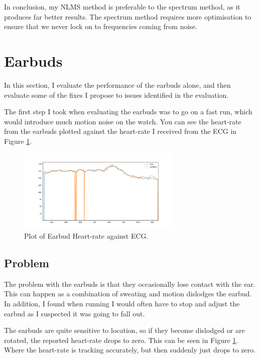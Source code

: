 \documentclass[12pt,a4paper,twoside,openright]{report}
\begin{document}
In conclusion, my NLMS method is preferable to the spectrum method, as it
produces far better results. The spectrum method requires more optimisation to
ensure that we never lock on to frequencies coming from noise.

\section{Earbuds}

In this section, I evaluate the performance of the earbuds alone, and then
evaluate some of the fixes I propose to issues identified in the evaluation.

The first step I took when evaluating the earbuds was to go on a fast run,
which would introduce much motion noise on the watch. You can see the
heart-rate from the earbuds plotted against the heart-rate I received from the
ECG in Figure \ref{fig:earbud-fast}.

\begin{figure}[tbh]
	\centerline{\includegraphics[width=0.7\textwidth]{figs/earbud-fast-graph.png}}
	\caption{Plot of Earbud Heart-rate against ECG.}
	\label{fig:earbud-fast}
\end{figure}

\subsection{Problem} \label{sec:earbud-problem}

The problem with the earbuds is that they occasionally lose contact with the
ear. This can happen as a combination of sweating and motion dislodges the
earbud. In addition, I found when running I would often have to stop and
adjust the earbud as I suspected it was going to fall out. 

The earbuds are quite sensitive to location, so if they become dislodged or
are rotated, the reported heart-rate drops to zero. This can be seen in Figure
\ref{fig:earbud-fast}. Where the heart-rate is tracking accurately, but then
suddenly just drops to zero.
\end{document}
